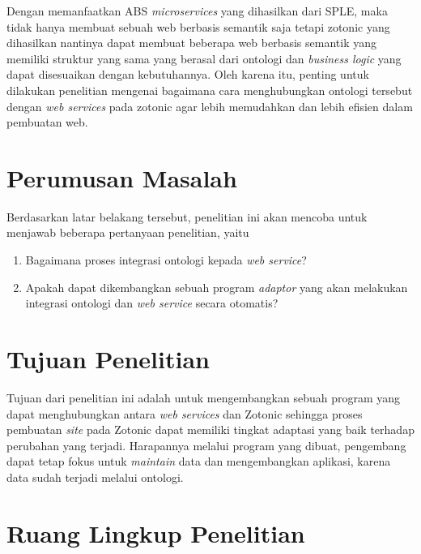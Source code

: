 Dengan memanfaatkan ABS \textit{microservices} yang dihasilkan dari SPLE, maka tidak hanya membuat sebuah web berbasis semantik saja tetapi zotonic yang dihasilkan nantinya dapat membuat beberapa web berbasis semantik yang memiliki struktur yang sama yang berasal dari ontologi dan \textit{business logic} yang dapat disesuaikan dengan kebutuhannya. Oleh karena itu, penting untuk dilakukan penelitian mengenai bagaimana cara menghubungkan ontologi tersebut dengan \textit{web services} pada zotonic agar lebih memudahkan dan lebih efisien dalam pembuatan web.
\section{Perumusan Masalah}
Berdasarkan latar belakang tersebut, penelitian ini akan mencoba untuk menjawab beberapa pertanyaan penelitian, yaitu
\begin{enumerate}
\item Bagaimana proses integrasi ontologi kepada \textit{web service}?
\item Apakah dapat dikembangkan sebuah program \textit{adaptor} yang akan melakukan integrasi ontologi dan \textit{web service} secara otomatis?
\end{enumerate}
\section{Tujuan Penelitian}
Tujuan dari penelitian ini adalah untuk mengembangkan sebuah program yang dapat menghubungkan antara \textit{web services} dan Zotonic sehingga proses pembuatan \textit{site} pada Zotonic dapat memiliki tingkat adaptasi yang baik terhadap perubahan yang terjadi. Harapannya melalui program yang dibuat, pengembang dapat tetap fokus untuk \textit{maintain} data dan mengembangkan aplikasi, karena data sudah terjadi melalui ontologi.

\section{Ruang Lingkup Penelitian}

